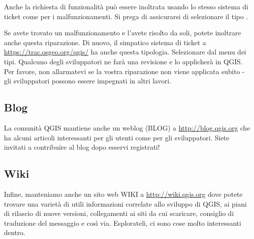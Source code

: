 Anche la richiesta di funzionalità può essere inoltrata usando lo stesso sistema di ticket come per i malfunzionamenti. Si prega di assicurarsi di selezionare il tipo .

Se avete trovato un malfunzionamento e l'avete risolto da soli, potete inoltrare anche questa riparazione. Di nuovo, il simpatico sistema di ticket a \url{https://trac.osgeo.org/qgis/} ha anche questa tipologia. Selezionare  dal menu dei tipi. Qualcuno degli sviluppatori ne farà una revisione e lo applicherà in QGIS. \\
Per favore, non allarmatevi se la vostra riparazione non viene applicata subito - gli sviluppatori possono essere impegnati in altri lavori.

\subsection{Blog}
La comunità QGIS mantiene anche un weblog (BLOG) a \url{http://blog.qgis.org} che ha alcuni articoli interessanti per gli utenti come per gli sviluppatori. Siete invitati a contribuire al blog dopo esservi registrati!

\subsection{Wiki}
Infine, manteniamo anche un sito web WIKI a \url{http://wiki.qgis.org} dove potete trovare una varietà di utili informazioni correlate allo sviluppo di QGIS, ai piani di rilascio di nuove versioni, collegamenti ai siti da cui scaricare, consiglio di traduzione del messaggio e così via. Esplorateli, ci sono cose molto interessanti dentro.

